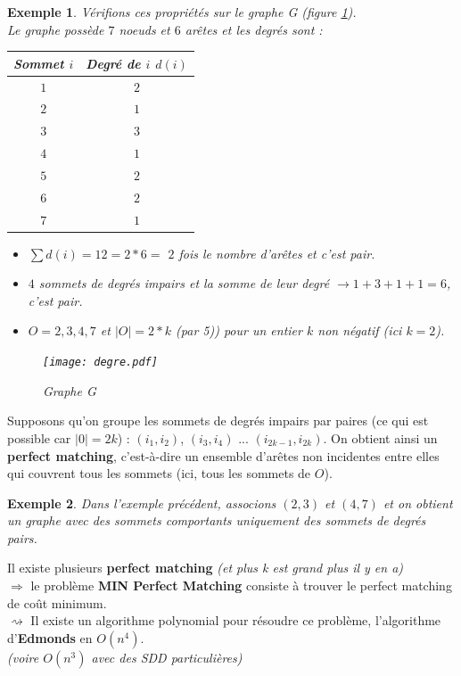 \documentclass[12pt]{article}
\newtheorem{exemple}{Exemple}[section]
\begin{document}
\begin{exemple}Vérifions ces propriétés sur le graphe G (figure \ref{grapheg}).\\
Le graphe possède $7$ noeuds et $6$ arêtes et les degrés sont :
\begin{center}
\begin{tabular}{c|c}
Sommet $i$ & Degré de $i$ $d(i)$ \\
\hline
$1$ & $2$ \\
$2$ & $1$ \\
$3$ & $3$ \\
$4$ & $1$ \\
$5$ & $2$ \\
$6$ & $2$ \\
$7$ & $1$ \\
\end{tabular}
\end{center}
\begin{itemize}
\item $\sum{d(i)} = 12 = 2\ast6 =$ $2$ fois le nombre d'arêtes et c'est pair.
\item $4$ sommets de degrés impairs et la somme de leur degré $\rightarrow 1+3+1+1 = 6$, c'est pair.
\item $O = {2,3,4,7}$ et $|O| = 2*k$ (par 5)) pour un entier $k$ non négatif (ici $k=2$).
\end{itemize}
\begin{figure}[H]
    \begin{center}
    \texttt{[image: degre.pdf]}
    \caption{Graphe G}
    \label{grapheg}
    \end{center}
\end{figure}
\end{exemple}



Supposons qu'on groupe les sommets de degrés impairs par paires (ce qui est possible car $|0| = 2k$) : $(i_1,i_2)$, $(i_3,i_4)$ ...
$(i_{2k-1},i_{2k})$. On obtient ainsi un \textbf{perfect matching}, c'est-à-dire un ensemble d'arêtes non incidentes entre elles qui
couvrent tous les sommets (ici, tous les sommets de $O$).

\begin{exemple} Dans l'exemple précédent, associons $(2,3)$ et $(4,7)$ et on obtient un graphe avec des sommets comportants uniquement des
sommets de degrés pairs.
\end{exemple}

\noindent Il existe plusieurs \textbf{perfect matching} \textit{(et plus k est grand plus il y en a)} \\
$\Longrightarrow$ le problème \textbf{MIN Perfect Matching} consiste à trouver le perfect matching de coût minimum. \\
$\rightsquigarrow$ Il existe un algorithme polynomial pour résoudre ce problème, l'algorithme d'\textbf{Edmonds} en $O(n^4)$.\\
\textit{(voire $O(n^3)$ avec des SDD particulières)}
\end{document}
